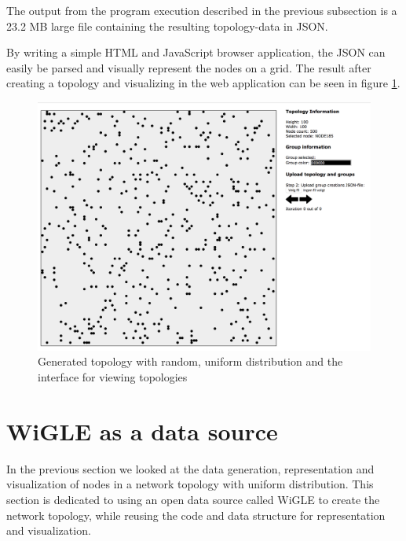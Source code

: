 The output from the program execution described in the previous subsection is a 23.2 MB large file containing the resulting topology-data in JSON.

By writing a simple HTML and JavaScript browser application, the JSON can easily be parsed and visually represent the nodes on a grid.
The result after creating a topology and visualizing in the web application can be seen in figure \ref{fig:randtop}.

\begin{figure}
\center
\includegraphics[scale=0.3]{Images/interface.png}
\caption{Generated topology with random, uniform distribution and the interface for viewing topologies}
\label{fig:randtop}
\end{figure}

\section{WiGLE as a data source}
In the previous section we looked at the data generation, representation and visualization of nodes in a network topology with uniform distribution. This section is dedicated
to using an open data source called WiGLE to create the network topology, while reusing the code and data structure for representation and visualization. 

